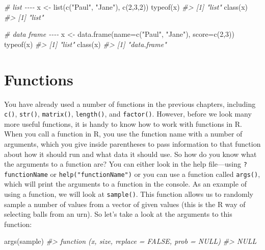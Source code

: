 \documentclass[
]{book}
\newenvironment{Shaded}{\begin{snugshade}}{\end{snugshade}}
\newcommand{\AttributeTok}[1]{\textcolor[rgb]{0.77,0.63,0.00}{#1}}
\newcommand{\CommentTok}[1]{\textcolor[rgb]{0.56,0.35,0.01}{\textit{#1}}}
\newcommand{\DecValTok}[1]{\textcolor[rgb]{0.00,0.00,0.81}{#1}}
\newcommand{\FunctionTok}[1]{\textcolor[rgb]{0.00,0.00,0.00}{#1}}
\newcommand{\NormalTok}[1]{#1}
\newcommand{\OtherTok}[1]{\textcolor[rgb]{0.56,0.35,0.01}{#1}}
\newcommand{\StringTok}[1]{\textcolor[rgb]{0.31,0.60,0.02}{#1}}
\begin{document}
\begin{Shaded}
\begin{Highlighting}[]
\CommentTok{\# list {-}{-}{-}{-}}
\NormalTok{x }\OtherTok{\textless{}{-}} \FunctionTok{list}\NormalTok{(}\FunctionTok{c}\NormalTok{(}\StringTok{"Paul"}\NormalTok{, }\StringTok{"Jane"}\NormalTok{), }\FunctionTok{c}\NormalTok{(}\DecValTok{2}\NormalTok{,}\DecValTok{3}\NormalTok{,}\DecValTok{2}\NormalTok{))}
\FunctionTok{typeof}\NormalTok{(x)}
\CommentTok{\#\textgreater{} [1] "list"}
\FunctionTok{class}\NormalTok{(x)}
\CommentTok{\#\textgreater{} [1] "list"}

\CommentTok{\# data frame {-}{-}{-}{-}}
\NormalTok{x }\OtherTok{\textless{}{-}} \FunctionTok{data.frame}\NormalTok{(}\AttributeTok{name=}\FunctionTok{c}\NormalTok{(}\StringTok{"Paul"}\NormalTok{, }\StringTok{"Jane"}\NormalTok{), }\AttributeTok{score=}\FunctionTok{c}\NormalTok{(}\DecValTok{2}\NormalTok{,}\DecValTok{3}\NormalTok{))}
\FunctionTok{typeof}\NormalTok{(x)}
\CommentTok{\#\textgreater{} [1] "list"}
\FunctionTok{class}\NormalTok{(x)}
\CommentTok{\#\textgreater{} [1] "data.frame"}
\end{Highlighting}
\end{Shaded}

\hypertarget{functions}{%
\section{Functions}\label{functions}}

You have already used a number of functions in the previous chapters, including \texttt{c()}, \texttt{str()},
\texttt{matrix()}, \texttt{length()}, and \texttt{factor()}. However, before we look many more useful functions, it is handy to know how to work with functions in R.
When you call a function in R, you use the function name with a number of arguments, which you give inside parentheses to pass information to that function about how it should run and what data it should use. So how do you know what the arguments to a function are? You can either look in the help file---using \texttt{?functionName} or \texttt{help("functionName")} or you can use a function called \texttt{args()}, which will print the arguments to a function in the console. As an example of using a function, we will look at \texttt{sample()}. This function allows us to randomly sample a number of values from a
vector of given values (this is the R way of selecting balls from an urn). So let's take a look at the arguments to this function:

\begin{Shaded}
\begin{Highlighting}[]
\FunctionTok{args}\NormalTok{(sample)}
\CommentTok{\#\textgreater{} function (x, size, replace = FALSE, prob = NULL) }
\CommentTok{\#\textgreater{} NULL}
\end{Highlighting}
\end{Shaded}
\end{document}
